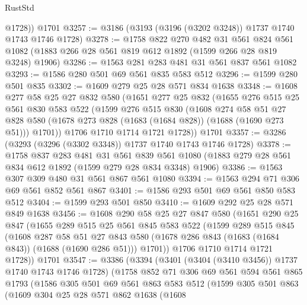 \begin{lexlean}{RustStd}
\begin{coremodule}
        @1728))
    @1701
@3257 := @3186 (@3193 (@3196 (@3202 @3248)) @1737 @1740 @1743 @1746 @1728)
@3278 := @1758
    @822
    @270
    @482
    @31
    @561
    @824
    @561
    @1082
    (@1883 @266 @28 @561 @819 @612 @1892 (@1599 @266 @28 @819 @3248) @1906)
@3286 := @1563 @281 @283 @481 @31 @561 @837 @561 @1082
@3293 := @1586 @280 @501 @69 @561 @835 @583 @512
@3296 := @1599 @280 @501 @835
@3302 := @1609 @279 @25 @28 @571 @834 @1638
@3348 := @1608
    @277
    @58
    @25
    @27
    @832
    @580
    (@1651
      @277
      @25
      @832
      (@1655
        @276
        @515
        @25
        @561
        @830
        @583
        @522
        (@1599
          @276
          @515
          @830
          (@1608
            @274
            @58
            @51
            @27
            @828
            @580
            (@1678 @273 @828 (@1683 (@1684 @828)) (@1688 (@1690 @273 @51)))
            @1701))
        @1706
        @1710
        @1714
        @1721
        @1728))
    @1701
@3357 := @3286 (@3293 (@3296 (@3302 @3348)) @1737 @1740 @1743 @1746 @1728)
@3378 := @1758
    @837
    @283
    @481
    @31
    @561
    @839
    @561
    @1080
    (@1883 @279 @28 @561 @834 @612 @1892 (@1599 @279 @28 @834 @3348) @1906)
@3386 := @1563 @307 @309 @480 @31 @561 @867 @561 @1080
@3394 := @1563 @294 @71 @306 @69 @561 @852 @561 @867
@3401 := @1586 @293 @501 @69 @561 @850 @583 @512
@3404 := @1599 @293 @501 @850
@3410 := @1609 @292 @25 @28 @571 @849 @1638
@3456 := @1608
    @290
    @58
    @25
    @27
    @847
    @580
    (@1651
      @290
      @25
      @847
      (@1655
        @289
        @515
        @25
        @561
        @845
        @583
        @522
        (@1599
          @289
          @515
          @845
          (@1608
            @287
            @58
            @51
            @27
            @843
            @580
            (@1678 @286 @843 (@1683 (@1684 @843)) (@1688 (@1690 @286 @51)))
            @1701))
        @1706
        @1710
        @1714
        @1721
        @1728))
    @1701
@3547 := @3386
    (@3394
      (@3401 (@3404 (@3410 @3456)) @1737 @1740 @1743 @1746 @1728)
      (@1758
        @852
        @71
        @306
        @69
        @561
        @594
        @561
        @865
        @1793
        (@1586
          @305
          @501
          @69
          @561
          @863
          @583
          @512
          (@1599
            @305
            @501
            @863
            (@1609
              @304
              @25
              @28
              @571
              @862
              @1638
              (@1608

\end{coremodule}
\end{lexlean}
